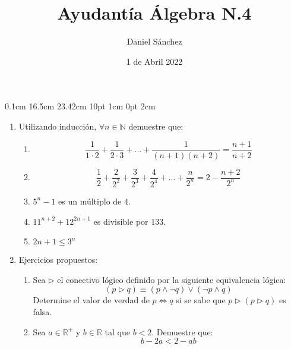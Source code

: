 \documentclass[12pt]{article}
\newcommand{\D}{\displaystyle}
\begin{document}
\setmargins{2.5cm}
{0.1cm}
{16.5cm}
{23.42cm}
{10pt}
{1cm}
{0pt}
{2cm}

\title{Ayudant\'ia \'Algebra N.4}
\date{1 de Abril 2022}
\author{Daniel S\'anchez}
\maketitle

\begin{enumerate}
      \item Utilizando inducci\'on, $\forall n \in \mathbb{N}$ demuestre que:
            \begin{enumerate}
                  \item 
                        $$\D \frac{1}{1 \cdot 2}+\frac{1}{2\cdot 3}+...+\frac{1}{(n+1)(n+2)}=\frac{n+1}{n+2}$$
                  \item 
                        $$\frac{1}{2}+\frac{2}{2^2}+\frac{3}{2^3}+\frac{4}{2^4}+...+\frac{n}{2^n}=2-\frac{n+2}{2^n}$$
                  \item $5^{n}-1$ es un m\'ultiplo de 4.
                  \item $\D 11^{n+2}+12^{2n+1}$ es divisible por 133.
                  \item $2n+1\leq 3^n$
            \end{enumerate}
      \item Ejercicios propuestos:
            \begin{enumerate}
                  \item Sea $\triangleright$ el conectivo l\'ogico definido por la siguiente equivalencia l\'ogica:
                        $$(p \triangleright q)\equiv (p \land \neg q) \lor (\neg p \land q)$$
                        Determine el valor de verdad de $p \Leftrightarrow q$ si se sabe que $p \triangleright (p \triangleright q)$ es falsa.
                  \item Sea $a \in \mathbb{R}^+$ y $b \in \mathbb{R}$ tal que $b<2$. Demuestre que:
                        $$b-2a<2-ab$$
            \end{enumerate}
\end{enumerate}
\end{document}
